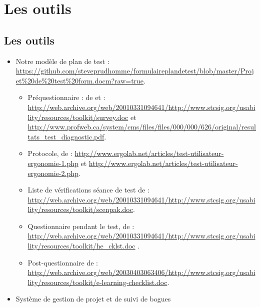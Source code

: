 	
	\section{Les outils} 
	\subsection{Les outils} 
		\begin{frame}[allowframebreaks]
			\begin {itemize}
			\item Notre modèle de plan de test : \url{https://github.com/steveprudhomme/formulaireplandetest/blob/master/Projet\%20de\%20test\%20form.docm?raw=true}.
				\begin {itemize}
				\item Préquestionnaire : de \citet{xerox1995b} et \citet{apop2013a} : \url{http://web.archive.org/web/20010331094641/http://www.stcsig.org/usability/resources/toolkit/survey.doc} et  \url{http://www.profweb.ca/system/cms/files/files/000/000/626/original/resultats_test_diagnostic.pdf}.
				\item Protocole, de \citet{ergolab2014a} : \url{http://www.ergolab.net/articles/test-utilisateur-ergonomie-1.php} et \url{http://www.ergolab.net/articles/test-utilisateur-ergonomie-2.php}.
				\item Liste de vérifications séance de test de \citet{naughton1995a} : \url{http://web.archive.org/web/20010331094641/http://www.stcsig.org/usability/resources/toolkit/scenpak.doc}.
				\item Questionnaire pendant le test, de \citet{xerox1995a} : \url{http://web.archive.org/web/20010331094641/http://www.stcsig.org/usability/resources/toolkit/he\_cklst.doc} .
				\item Post-questionnaire de \citet{miller2002a} : \url{http://web.archive.org/web/20030403063406/http://www.stcsig.org/usability/resources/toolkit/e-learning-checklist.doc}.
				\end{itemize}
			\framebreak
			\item Système de gestion de projet et de suivi de bogues 
			

\end{itemize}
\end{frame}
